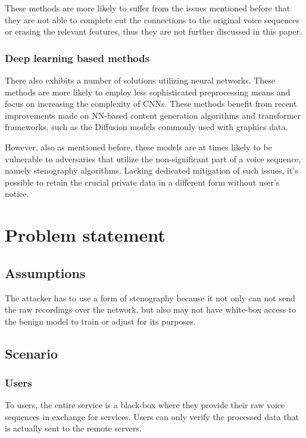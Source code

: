 \documentclass[journal]{IEEEtran} %
\begin{document}
These methods are more likely to suffer from the issues mentioned before that they are not able to complete cut the connections to the original voice sequences or erasing the relevant features, thus they are not further discussed in this paper.

\subsubsection{Deep learning based methods}

There also exhibits a number of solutions utilizing neural networks. These methods are more likely to employ less sophisticated preprocessing means and focus on increasing the complexity of CNNs. These methods benefit from recent improvements made on NN-based content generation algorithms and transformer frameworks, such as the Diffusion models commonly used with graphics data.\cite{a8}

However, also as mentioned before, these models are at times likely to be vulnerable to adversaries that utilize the non-significant part of a voice sequence, namely stenography algorithms. Lacking dedicated mitigation of such issues, it's possible to retain the crucial private data in a different form without user's notice.

\section{Problem statement}
\label{seg:problem}

\subsection{Assumptions}

The attacker has to use a form of stenography because it not only can not send the raw recordings over the network, but also may not have white-box access to the benign model to train or adjust for its purposes.

\subsection{Scenario}

\subsubsection{Users}

To users, the entire service is a black-box where they provide their raw voice sequences in exchange for services. Users can only verify the processed data that is actually sent to the remote servers.
\end{document}
